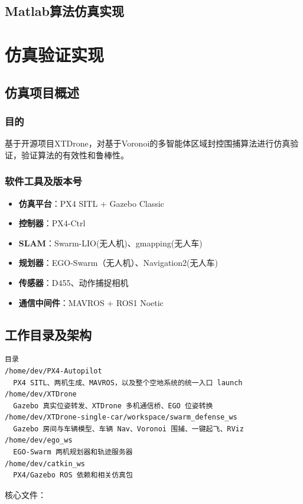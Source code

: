 \subsection{Matlab算法仿真实现}

\section{仿真验证实现}

\subsection{仿真项目概述}
\subsubsection{目的}
基于开源项目XTDrone，对基于Voronoi的多智能体区域封控围捕算法进行仿真验证，验证算法的有效性和鲁棒性。
\subsubsection{软件工具及版本号}
\begin{itemize}
    \item \textbf{仿真平台}：PX4 SITL + Gazebo Classic
    \item \textbf{控制器}：PX4-Ctrl
    \item \textbf{SLAM}：Swarm-LIO(无人机)、gmapping(无人车)
    \item \textbf{规划器}：EGO-Swarm（无人机）、Navigation2(无人车)
    \item \textbf{传感器}：D455、动作捕捉相机
    \item \textbf{通信中间件}：MAVROS + ROS1 Noetic
\end{itemize}
\subsection{工作目录及架构}
\begingroup\scriptsize
\begin{verbatim}
目录
/home/dev/PX4-Autopilot
  PX4 SITL、两机生成、MAVROS，以及整个空地系统的统一入口 launch
/home/dev/XTDrone
  Gazebo 真实位姿转发、XTDrone 多机通信桥、EGO 位姿转换
/home/dev/XTDrone-single-car/workspace/swarm_defense_ws
  Gazebo 房间与车辆模型、车辆 Nav、Voronoi 围捕、一键起飞、RViz
/home/dev/ego_ws
  EGO-Swarm 两机规划器和轨迹服务器
/home/dev/catkin_ws
  PX4/Gazebo ROS 依赖和相关仿真包
\end{verbatim}
\endgroup

核心文件：

